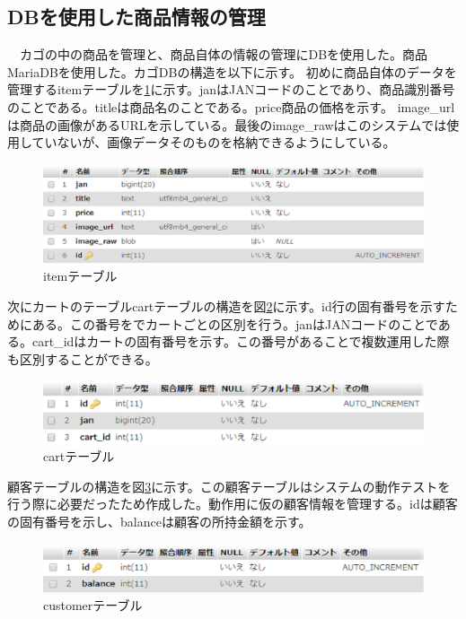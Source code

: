 \subsection*{DBを使用した商品情報の管理}
　カゴの中の商品を管理と、商品自体の情報の管理にDBを使用した。商品MariaDBを使用した。カゴDBの構造を以下に示す。
初めに商品自体のデータを管理するitemテーブルを\ref{item_db}に示す。janはJANコードのことであり、商品識別番号のことである。titleは商品名のことである。price商品の価格を示す。
image\_urlは商品の画像があるURLを示している。最後のimage\_rawはこのシステムでは使用していないが、画像データそのものを格納できるようにしている。
\begin{figure}[htbp]
\centering
\includegraphics[width=12cm]{./pic/item_db.eps}
\caption{itemテーブル}
\label{item_db}
\end{figure}

\newpage

次にカートのテーブルcartテーブルの構造を図\ref{cart_db}に示す。id行の固有番号を示すためにある。この番号をでカートごとの区別を行う。janはJANコードのことである。cart\_idはカートの固有番号を示す。この番号があることで複数運用した際も区別することができる。
\begin{figure}[htbp]
\centering
\includegraphics[width=12cm]{./pic/cart_db.eps}
\caption{cartテーブル}
\label{cart_db}
\end{figure}


顧客テーブルの構造を図\ref{customer_db}に示す。この顧客テーブルはシステムの動作テストを行う際に必要だったため作成した。動作用に仮の顧客情報を管理する。idは顧客の固有番号を示し、balanceは顧客の所持金額を示す。

\begin{figure}[htbp]
\centering
\includegraphics[width=12cm]{./pic/customer.eps}
\caption{customerテーブル}
\label{customer_db}
\end{figure}

